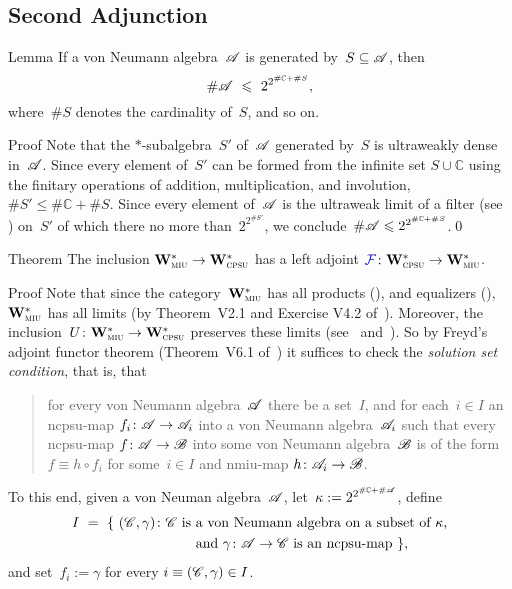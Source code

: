\documentclass[a]{subfiles}
\begin{document}
\subsection{Second Adjunction}
\begin{parsec}%
\begin{point}{Lemma}%
If a von Neumann algebra~$\mathscr{A}$
is generated by~$S\subseteq \mathscr{A}$,
then
\begin{equation*}
\#\scrA \ \leq\  2^{2^{\#\mathbb{C}+\#S}},
\end{equation*}
where~$\#S$ denotes the cardinality of~$S$, and so on.
\begin{point}{Proof}%
Note that the
$*$-subalgebra~$S'$ of~$\mathscr{A}$
generated by~$S$
is ultraweakly dense in~$\mathscr{A}$.
Since every element of~$S'$
can be formed
from the infinite set $S\cup \mathbb{C}$ using 
the finitary operations
of
addition, multiplication,
and
involution,
$\#S'\leq \#\mathbb{C}+ \#S$.
Since every element of~$\mathscr{A}$
is the ultraweak limit of a filter
(see \cite[\S12]{willard1970})
on~$S'$
of which there no more than~$2^{2^{\#S'}}$,
we conclude~$\#\mathscr{A} \leqslant 2^{2^{\#\mathbb{C}+\#S}}$.\qed
\end{point}
\end{point}
\begin{point}{Theorem}%
The inclusion $\mathbf{W}^*_{\text{\textsc{miu}}}\to\mathbf{W}^*_{\text{\textsc{cpsu}}}$
has a left adjoint $\Define{\mathcal{F}}\colon \W{cpsu}\to\W{miu}$.
\begin{point}{Proof}%
Note that since the category~$\mathbf{W}^*_{\text{\textsc{miu}}}$
has all products (),
and equalizers (),
$\mathbf{W}^*_{\text{\textsc{miu}}}$ has all limits 
(by Theorem~V2.1 and Exercise V4.2 of~\cite{maclane}).
Moreover, the inclusion~$U\colon \mathbf{W}^*_{\text{\textsc{miu}}}\to\mathbf{W}^*_{\text{\textsc{cpsu}}}$
preserves these limits (see~ and~).
So by Freyd's adjoint functor theorem (Theorem~V6.1 of~\cite{maclane})
it suffices to check the \emph{solution set condition},
that is,
that 
\begin{quote}
for every von Neumann algebra~$\mathscr{A}$
there 
be a set~$I$,
and for each~$i\in I$ an ncpsu-map $f_i\colon \mathscr{A}\to\mathscr{A}_i$
into a von Neumann algebra~$\mathscr{A}_i$
such that every ncpsu-map $f\colon \mathscr{A}\to \mathscr{B}$
into some von Neumann algebra~$\mathscr{B}$
is of the form~$ f\equiv h\circ f_i$
for some~$i\in I$ and nmiu-map $h\colon \mathscr{A}_i\to\mathscr{B}$.
\end{quote}
To this end, given a von Neuman algebra~$\mathscr{A}$,
let~$\kappa:=2^{2^{\#\mathbb{C}+\#\mathscr{A}}}$, define
\begin{alignat*}{3}
	I\ = \ \{\ (\mathscr{C},\gamma)\colon \mathscr{C}\text{ is }&
	\text{a von Neumann algebra
	on a subset of~$\kappa$,}\\
&\text{and $\gamma \colon \mathscr{A}\to\mathscr{C}$ is an ncpsu-map} \ \},
\end{alignat*}
and set~$f_i := \gamma$ for every $i\equiv(\mathscr{C},\gamma)\in I$.


\end{point}
\end{point}
\end{parsec}
\end{document}
